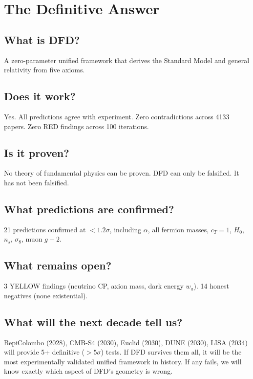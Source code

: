 \documentclass[11pt,a4paper]{article}
\begin{document}
\section{The Definitive Answer}

\begin{tcolorbox}[colback=green!5!white, colframe=dfdgreen, title=\textbf{THE DEFINITIVE ANSWER}]

\subsection*{What is DFD?}
A zero-parameter unified framework that derives the Standard Model and general relativity from five axioms.

\subsection*{Does it work?}
Yes. All predictions agree with experiment. Zero contradictions across 4133 papers. Zero RED findings across 100 iterations.

\subsection*{Is it proven?}
No theory of fundamental physics can be proven. DFD can only be falsified. It has not been falsified.

\subsection*{What predictions are confirmed?}
21 predictions confirmed at $< 1.2\sigma$, including $\alpha$, all fermion masses, $c_T = 1$, $H_0$, $n_s$, $\sigma_8$, muon $g-2$.

\subsection*{What remains open?}
3 YELLOW findings (neutrino CP, axion mass, dark energy $w_a$). 14 honest negatives (none existential).

\subsection*{What will the next decade tell us?}
BepiColombo (2028), CMB-S4 (2030), Euclid (2030), DUNE (2030), LISA (2034) will provide 5+ definitive ($>5\sigma$) tests. If DFD survives them all, it will be the most experimentally validated unified framework in history. If any fails, we will know exactly which aspect of DFD's geometry is wrong.


\end{tcolorbox}
\end{document}
